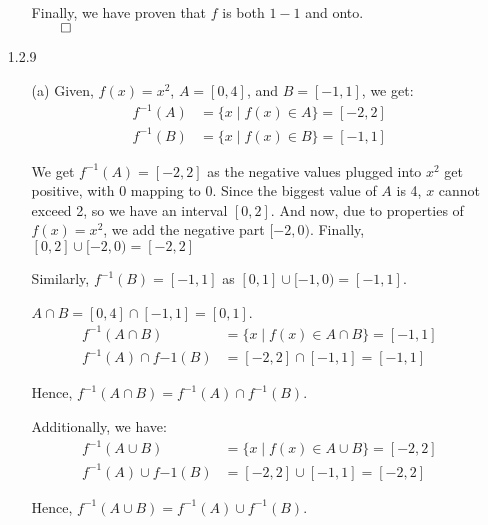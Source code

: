 \documentclass[11pt]{article}
\begin{document}
\begin{itemize}
\begin{itemize}
            Finally, we have proven that $f$ is both $1 - 1$ and onto.\\
            $\qed$
        \end{itemize}

    \item[1.2.9]
        \begin{itemize}
            \item[(a)]
                Given, $f(x) = x^2$, $A = [0, 4]$, and $B = [-1, 1]$, we get:
                \begin{align*}
                    f^{-1}(A) &= \{x \mid f(x) \in A\} = [-2, 2]\\
                    f^{-1}(B) &= \{x \mid f(x) \in B\} = [-1, 1]
                \end{align*}

                We get $f^{-1}(A) = [-2, 2]$ as the negative values plugged
                into $x^2$ get positive, with 0 mapping to 0. Since the biggest
                value of $A$ is 4, $x$ cannot exceed 2, so we have an interval
                $[0, 2]$. And now, due to properties of $f(x) = x^2$, we add
                the negative part $[-2, 0)$. Finally, $[0, 2] \cup
                [-2, 0) = [-2, 2]$

                Similarly, $f^{-1}(B) = [-1, 1]$ as $[0, 1] \cup [-1, 0) =
                [-1, 1]$.
                
                $A \cap B = [0, 4] \cap [-1, 1] = [0, 1]$.
                \begin{align*}
                    f^{-1}(A \cap B)        &= \{x \mid f(x) \in A \cap B\} = [-1, 1]\\
                    f^{-1}(A) \cap f{-1}(B) &= [-2, 2] \cap [-1, 1] = [-1, 1]
                \end{align*}
                
                Hence, $f^{-1}(A \cap B) = f^{-1}(A) \cap f^{-1}(B)$.
                
                Additionally, we have:
                \begin{align*}
                    f^{-1}(A \cup B)        &= \{x \mid f(x) \in A \cup B\} = [-2, 2]\\
                    f^{-1}(A) \cup f{-1}(B) &= [-2, 2] \cup [-1, 1] = [-2, 2]
                \end{align*}
                
                Hence, $f^{-1}(A \cup B) = f^{-1}(A) \cup f^{-1}(B)$.


\end{itemize}
\end{itemize}
\end{document}
